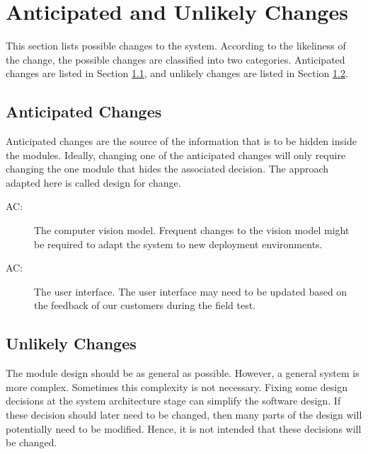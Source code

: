 \documentclass[12pt, titlepage]{article}
\newcounter{acnum}
\newcommand{\actheacnum}{AC\theacnum}
\begin{document}
\section{Anticipated and Unlikely Changes} \label{SecChange}

This section lists possible changes to the system. According to the likeliness
of the change, the possible changes are classified into two categories.
Anticipated changes are listed in Section \ref{SecAchange}, and unlikely
changes are listed in Section \ref{SecUchange}.

\subsection{Anticipated Changes} \label{SecAchange}

Anticipated changes are the source of the information that is to be hidden
inside the modules. Ideally, changing one of the anticipated changes will only
require changing the one module that hides the associated decision. The
approach adapted here is called design for change.

\begin{description}
  \item[ \actheacnum \label{acCV}:] The computer vision model. Frequent changes to the vision model might be required to adapt the system to new deployment environments.
  \item[ \actheacnum \label{acUI}:] The user interface. The user interface may need to be updated based on the feedback of our customers during the field test.
\end{description}

\subsection{Unlikely Changes} \label{SecUchange}

The module design should be as general as possible. However, a general system
is more complex. Sometimes this complexity is not necessary. Fixing some design
decisions at the system architecture stage can simplify the software design. If
these decision should later need to be changed, then many parts of the design
will potentially need to be modified. Hence, it is not intended that these
decisions will be changed.
\end{document}
